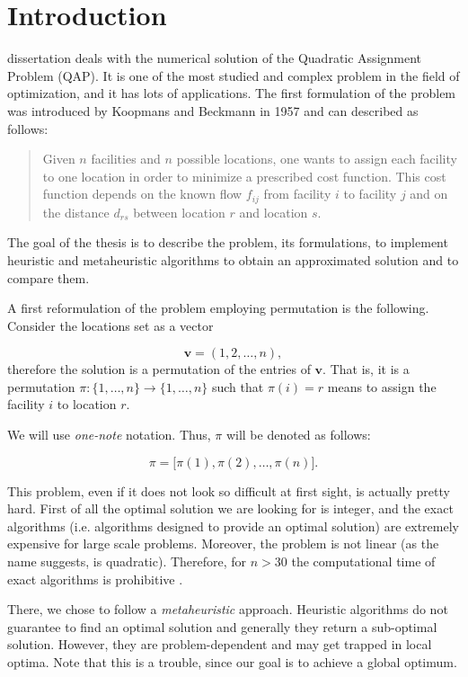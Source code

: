 \chapter{Introduction}
 dissertation deals with the numerical solution of the Quadratic Assignment Problem (QAP). It is one of the most studied and complex problem in the field of optimization, and it has lots of applications. The first formulation of the problem was introduced by Koopmans and Beckmann \cite{Koopmans1957} in 1957 and can described as follows:

\begin{quote}
Given $n$ facilities and $n$ possible locations, one wants to assign each facility to one location in order to minimize a prescribed cost function. This cost function depends on the known flow $f_{ij}$ from facility $i$ to facility $j$ and  on the distance $d_{rs}$ between location $r$ and location $s$. 
\end{quote}

The goal of the thesis is to describe the problem, its formulations, to implement heuristic and metaheuristic algorithms to obtain an approximated solution and to compare them.

A first reformulation of the problem employing permutation is the following. Consider the locations set as a vector

\[\bm v = (1,2,\dots,n),\]
 therefore the solution is a permutation of the entries of $\bm v$.  That is, it is a permutation $\pi \colon \{1,\dots,n\}\to \{1,\dots,n \}$ such that $\pi(i)=r$ means to assign the facility $i$ to location $r$. 
 
We will use \textit{one-note} notation. Thus, $\pi$ will be denoted as follows:

\[
\pi=\big[\pi(1),\pi(2),\dots,\pi(n)\big].
\]

This problem, even if it does not look so difficult at first sight, is actually pretty hard. First of all the optimal solution we are looking for is integer, and the exact algorithms (i.e. algorithms designed to provide an optimal solution) are extremely expensive for large scale problems. Moreover, the problem is not linear (as the name suggests, is quadratic). Therefore, for $n>30$ the computational time of exact algorithms is prohibitive \cite[p. 210]{Burkard2012}.



There, we chose to follow a \textit{metaheuristic} approach. Heuristic algorithms do not guarantee to find an optimal solution and generally they return a sub-optimal solution. However, they are problem-dependent and may get trapped in local optima. Note that this is a trouble, since our goal is to achieve a global optimum.

